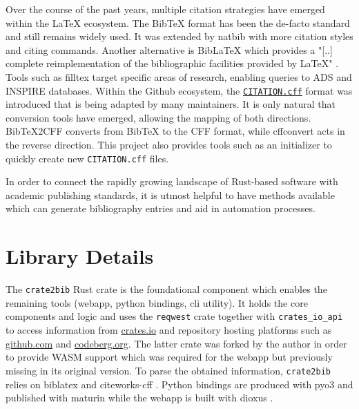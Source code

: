 \documentclass[11pt,a4paper]{article}
\begin{document}
Over the course of the past years, multiple citation strategies have emerged within the \LaTeX
ecosystem.
The BibTeX format has been the de-facto standard and still remains widely used.
It was extended by natbib \cite{Daly2025} with more citation styles and citing commands.
Another alternative is BibLaTeX which provides a "[..] complete reimplementation of
the bibliographic facilities provided by \LaTeX" \cite{biblatex2025}.
Tools such as \cite{Gerosa2017} filltex target specific areas of research, enabling queries to ADS and
INSPIRE databases.
Within the Github ecosystem, the
\href{https://citation-file-format.github.io/}{\texttt{CITATION.cff}} format
\cite{Druskat2021} was introduced that is being adapted by many maintainers.
It is only natural that conversion tools have emerged, allowing the mapping of both directions.
BibTeX2CFF \cite{Hahn2023} converts from BibTeX to the CFF format, while
cffconvert \cite{Spaaks2021} acts in the reverse direction.
This project also provides tools such as an initializer \cite{Spaaks2023} to quickly create
new \texttt{CITATION.cff} files.

In order to connect the rapidly growing landscape of Rust-based software with academic publishing
standards, it is utmost helpful to have methods available which can generate
bibliography entries and aid in automation processes.

\section*{Library Details}

The \texttt{crate2bib} Rust crate is the foundational component which enables the remaining tools (webapp,
python bindings, cli utility).
It holds the core components and logic and uses the \texttt{reqwest} \cite{McArthur2025} crate
together with \texttt{crates\_io\_api} \cite{Herzog2025} to access information from
\href{https://crates.io}{crates.io} and repository hosting platforms such as
\href{https://github.com}{github.com} and \href{https://codeberg.org/}{codeberg.org}.
The latter crate was forked by the author \cite{Pleyer2025} in order to provide WASM support which was
required for the webapp but previously missing in its original version.
To parse the obtained information, \texttt{crate2bib} relies on biblatex \cite{Haug2025} and citeworks-cff
\cite{Saparelli2022}.
Python bindings are produced with pyo3 \cite{pyo32025} and published with maturin \cite{maturin2025}
while the webapp is built with dioxus \cite{Kelley2025}.
\end{document}
